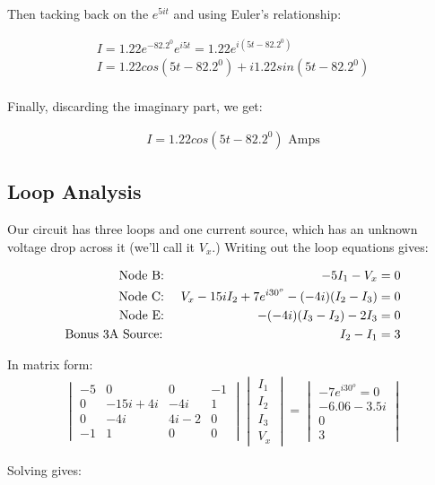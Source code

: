 Then tacking back on the $e^{5it}$ and using Euler's relationship:

\begin{align*}
I = 1.22e^{-82.2^0}e^{i5t}=1.22e^{i(5t-82.2^0)}\\
I=1.22cos(5t-82.2^0)+i1.22sin(5t-82.2^0)\\
\end{align*}

Finally, discarding the imaginary part, we get:

\begin{align*}
I=1.22cos(5t-82.2^0) \text{ Amps}
\end{align*}

\subsection{Loop Analysis}
Our circuit has three loops and one current source, which has an unknown voltage drop across it (we'll call it $V_x$.) Writing out the loop equations gives:

\begin{align}
\text{Node B: }&&-5I_1-V_x&=0 \notag\\
\text{Node C: }&&V_x-15iI_2+7e^{i30^o}-(-4i)(I_2-I_3)&=0\notag\\
\text{Node E: }&&-(-4i)(I_3-I_2)-2I_3&=0\notag\\
\text{Bonus 3A Source: }&&I_2-I_1&=3
\end{align}

In matrix form:
\begin{align}
\begin{vmatrix}
-5		&0		&0	&-1\\
0		&-15i+4i	&-4i	&1\\
0		&-4i		&4i-2 	&0\\
-1		&1		&0	&0
\end{vmatrix}
\begin{vmatrix}I_1\\I_2\\I_3\\V_x\end{vmatrix} =
\begin{vmatrix}-7e^{i30^o}=0\\-6.06-3.5i\\0\\3\end{vmatrix}
\end{align}

Solving gives:

